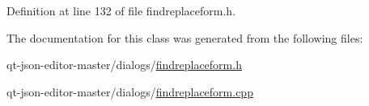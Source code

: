 Definition at line 132 of file findreplaceform.\+h.



The documentation for this class was generated from the following files\+:\begin{DoxyCompactItemize}
\item 
qt-\/json-\/editor-\/master/dialogs/\hyperlink{findreplaceform_8h}{findreplaceform.\+h}\item 
qt-\/json-\/editor-\/master/dialogs/\hyperlink{findreplaceform_8cpp}{findreplaceform.\+cpp}\end{DoxyCompactItemize}
